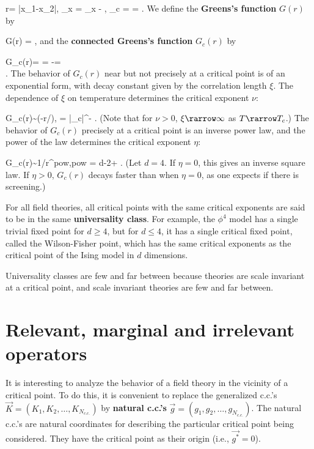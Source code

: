 \documentclass[12pt]{article}
\begin{document}
\beq
r= |x_1-x_2|,\;\;
\Delta\phi_x = \phi_x - ,\;\;
\theta_c = =
\;.
\eeq
We define the {\bf Greens's function} $G(r)$
by

\beq
G(r) = 
\;,
\eeq
and the \textbf{connected Greens's function}
 $G_c(r)$ by

\beq
G_c(r)=
=
-=
\\
\;.
\eeq
The behavior of $G_c(r)$ near but not precisely
at a critical point is of an
exponential form, with decay
constant given by the correlation length $\xi$.
The dependence of $\xi$ on temperature
determines the critical exponent $\nu$:

\beq
G_c(r)\sim \exp(-r/\xi),
\;\;
\xi = |\theta_c|^{-\nu}
\;.
\eeq
(Note that for $\nu>0$,
$\xi\rarrow \infty$ as $T\rarrow T_c$.)
The behavior of $G_c(r)$ precisely at
a critical point is an inverse power
law, and the power of the law
determines the critical exponent $\eta$:


\beq
G_c(r)\sim 1/r^{pow},\;\;pow = d-2+\eta
\;.
\eeq
(Let $d=4$. If $\eta=0$, this gives
an inverse square law. If $\eta>0$,
$G_c(r)$ decays faster than
when $\eta=0$,
as one expects if there is screening.)

For all
field theories, all critical points
with the same critical exponents
 are
said to be in the same
\textbf{universality class}.
For example, the $\phi^4$ model
has a single trivial fixed point for $d\geq 4$,
but for $d\leq 4$,
it has a single critical fixed
point, called the Wilson-Fisher point,
which has the same critical exponents
as the critical point
of the Ising model in $d$ dimensions.

Universality classes are few and far between
because theories are scale invariant
at a critical point,
and scale invariant theories are
few and far between.



\section{Relevant, marginal and irrelevant operators}

It is interesting
to analyze the behavior
of a field theory in the vicinity
of a critical point.
To do this, it
is convenient to replace
the
generalized c.c.'s
$\vec{K}=(K_1, K_2,\ldots, K_{N_{c.c.}})$
by \textbf{natural c.c.'s}
$\vec{g}=(g_1, g_2,\ldots, g_{N_{c.c.}})$.
The natural c.c.'s are natural
coordinates for describing
the particular
critical point
being considered. They
have the critical point as their origin
(i.e., $\vec{g^*}=0$).
\end{document}
